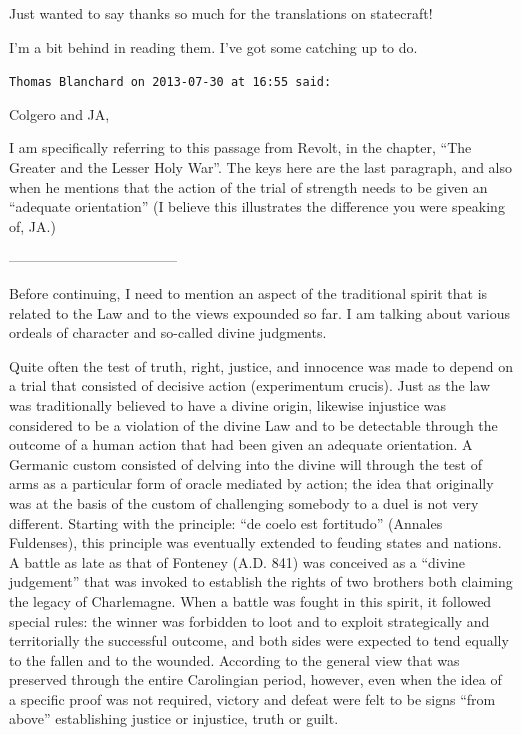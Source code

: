 \begin{footnotesize}
\begin{sffamily}
Just wanted to say thanks so much for the translations on statecraft!

I'm a bit behind in reading them. I've got some catching up to do.

\hfill

\texttt{Thomas Blanchard on 2013-07-30 at 16:55 said:}

Colgero and JA,

I am specifically referring to this passage from Revolt, in the chapter, ``The Greater and the Lesser Holy War''. The keys here are the last paragraph, and also when he mentions that the action of the trial of strength needs to be given an ``adequate orientation'' (I believe this illustrates the difference you were speaking of, JA.)

------------------------------------

Before continuing, I need to mention an aspect of the traditional spirit that is related to the Law and to the views expounded so far. I am talking about various ordeals of character and so-called divine judgments.

Quite often the test of truth, right, justice, and innocence was made to depend on a trial that consisted of decisive action (experimentum crucis). Just as the law was traditionally believed to have a divine origin, likewise injustice was considered to be a violation of the divine Law and to be detectable through the outcome of a human action that had been given an adequate orientation. A Germanic custom consisted of delving into the divine will through the test of arms as a particular form of oracle mediated by action; the idea that originally was at the basis of the custom of challenging somebody to a duel is not very different. Starting with the principle: ``de coelo est fortitudo'' (Annales Fuldenses), this principle was eventually extended to feuding states and nations. A battle as late as that of Fonteney (A.D. 841) was conceived as a ``divine judgement'' that was invoked to establish the rights of two brothers both claiming the legacy of Charlemagne. When a battle was fought in this spirit, it followed special rules: the winner was forbidden to loot and to exploit strategically and territorially the successful outcome, and both sides were expected to tend equally to the fallen and to the wounded. According to the general view that was preserved through the entire Carolingian period, however, even when the idea of a specific proof was not required, victory and defeat were felt to be signs ``from above'' establishing justice or injustice, truth or guilt.


\end{sffamily}
\end{footnotesize}
